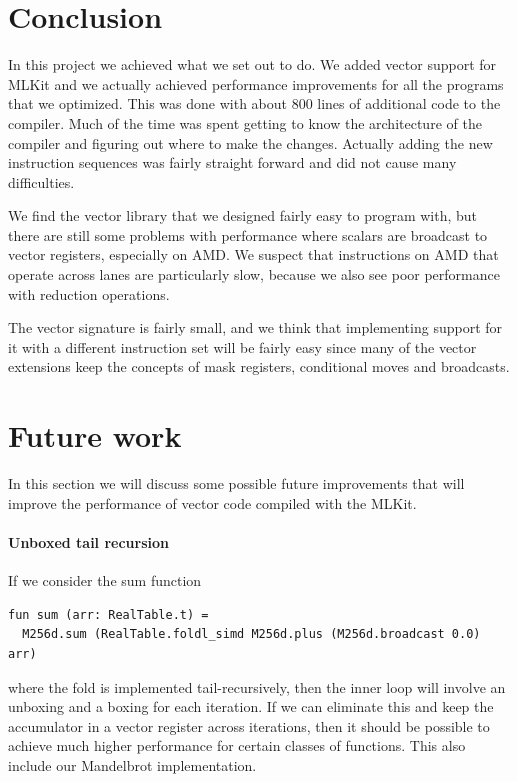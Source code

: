 \documentclass{article}
\begin{document}
\section{Conclusion}

In this project we achieved what we set out to do. We added vector support for MLKit and we actually achieved performance improvements for all the programs that we optimized. This was done with about 800 lines of additional code to the compiler. Much of the time was spent getting to know the architecture of the compiler and figuring out where to make the changes. Actually adding the new instruction sequences was fairly straight forward and did not cause many difficulties.

We find the vector library that we designed fairly easy to program with, but there are still some problems with performance where scalars are broadcast to vector registers, especially on AMD. We suspect that instructions on AMD that operate across lanes are particularly slow, because we also see poor performance with reduction operations.

The vector signature is fairly small, and we think that implementing support for it with a different instruction set will be fairly easy since many of the vector extensions keep the concepts of mask registers, conditional moves and broadcasts.

\section{Future work}

In this section we will discuss some possible future improvements that will improve the performance of vector code compiled with the MLKit.

\paragraph{Unboxed tail recursion}

If we consider the sum function
\begin{verbatim}
fun sum (arr: RealTable.t) =
  M256d.sum (RealTable.foldl_simd M256d.plus (M256d.broadcast 0.0) arr)
\end{verbatim}
where the fold is implemented tail-recursively, then the inner loop will involve an unboxing and a boxing for each iteration. If we can eliminate this and keep the accumulator in a vector register across iterations, then it should be possible to achieve much higher performance for certain classes of functions. This also include our Mandelbrot implementation.
\end{document}
